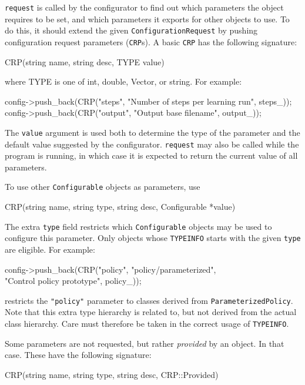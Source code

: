 \documentclass{article}
\newcommand{\txt}[1]{\texttt{#1}}
\newenvironment{code}{\alltt}{\endalltt}
\begin{document}
\txt{request} is called by the configurator to find out which parameters the
object requires to be set, and which parameters it exports for other objects
to use. To do this, it should extend the given \txt{ConfigurationRequest}
by pushing configuration request parameters (\txt{CRP}s). A basic \txt{CRP}
has the following signature:

\begin{code}
CRP(string name, string desc, TYPE value)
\end{code}

where TYPE is one of int, double, Vector, or string. For example:

\begin{code}
config->push_back(CRP("steps", "Number of steps per learning run", steps_));
config->push_back(CRP("output", "Output base filename", output_));
\end{code}

The \txt{value} argument is used both to determine the type of the parameter
and the default value suggested by the configurator. \txt{request} may also
be called while the program is running, in which case it is expected to
return the current value of all parameters.

To use other \txt{Configurable} objects as parameters, use

\begin{code}
CRP(string name, string type, string desc, Configurable *value)
\end{code}

The extra \txt{type} field restricts which \txt{Configurable} objects may
be used to configure this parameter. Only objects whose \txt{TYPEINFO}
starts with the given \txt{type} are eligible. For example:

\begin{code}
config->push_back(CRP("policy", "policy/parameterized",\\
                      "Control policy prototype", policy_));
\end{code}

restricts the \txt{"policy"} parameter to classes derived from
\txt{ParameterizedPolicy}. Note that this extra type hierarchy is related
to, but not derived from the actual class hierarchy. Care must therefore be
taken in the correct usage of \txt{TYPEINFO}.

Some parameters are not requested, but rather \emph{provided} by an object. In
that case. These have the following signature:

\begin{code}
CRP(string name, string type, string desc, CRP::Provided)
\end{code}
\end{document}
